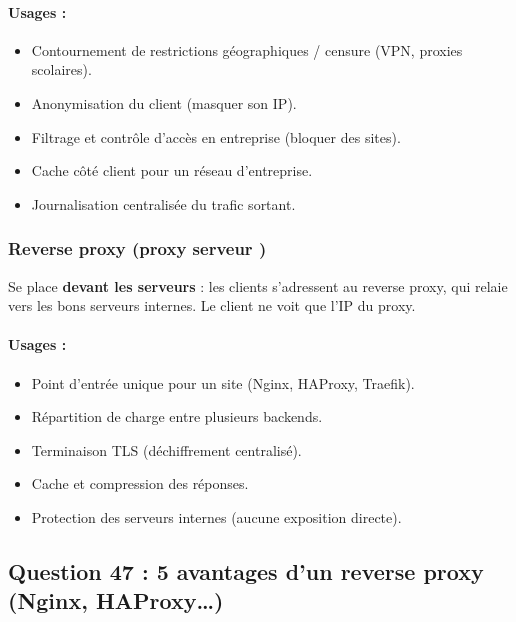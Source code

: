 \documentclass[12pt,a4paper]{article}
\begin{document}
\paragraph{Usages :}
\begin{itemize}
  \item Contournement de restrictions g\'eographiques / censure (VPN, proxies scolaires).
  \item Anonymisation du client (masquer son IP).
  \item Filtrage et contr\^ole d'acc\`es en entreprise (bloquer des sites).
  \item Cache c\^ot\'e client pour un r\'eseau d'entreprise.
  \item Journalisation centralis\'ee du trafic sortant.
\end{itemize}

\subsubsection*{Reverse proxy (proxy \og serveur \fg)}
Se place \textbf{devant les serveurs} : les clients s'adressent au reverse proxy, qui relaie vers les bons serveurs internes. Le client ne voit que l'IP du proxy.

\paragraph{Usages :}
\begin{itemize}
  \item Point d'entr\'ee unique pour un site (Nginx, HAProxy, Traefik).
  \item R\'epartition de charge entre plusieurs backends.
  \item Terminaison TLS (d\'echiffrement centralis\'e).
  \item Cache et compression des r\'eponses.
  \item Protection des serveurs internes (aucune exposition directe).
\end{itemize}

\subsection*{Question 47 : 5 avantages d'un reverse proxy (Nginx, HAProxy\ldots)}
\end{document}
